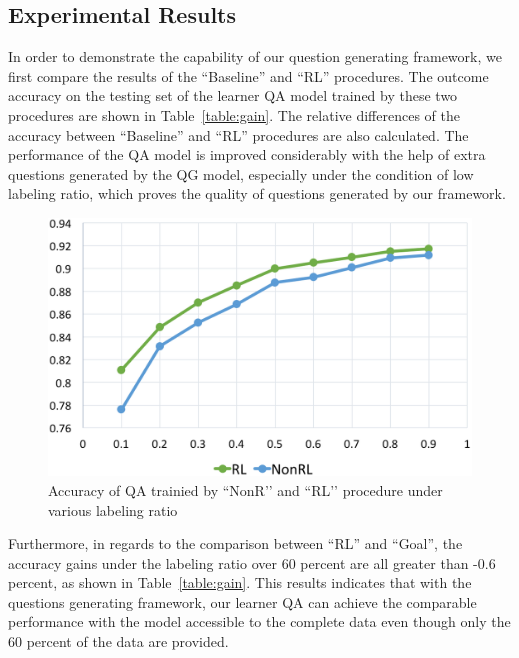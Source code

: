 \documentclass{article}
\begin{document}
\subsection{Experimental Results}
In order to demonstrate the capability of our question generating framework, we first compare the results of the ``Baseline'' and ``RL'' procedures.%
The outcome accuracy on the testing set of the learner QA model trained by these two procedures are shown in Table~\ref{table:gain}. The relative differences of the accuracy between ``Baseline'' and ``RL'' procedures are also calculated. The performance of the QA model is improved considerably with the help of extra questions generated by the QG model, especially under the condition of low labeling ratio, which proves the quality of questions generated by our framework.

\begin{figure}[t]
    \centering
    \includegraphics[width=0.95\linewidth]{fig/QA_acc.png}
    \caption{Accuracy of QA trainied by ``NonR’’ and ``RL’’ procedure under various labeling ratio}
    \label{fig:QA_acc}
\end{figure}

Furthermore, in regards to the comparison between ``RL'' and ``Goal'', the accuracy gains under the labeling ratio over 60 percent are all greater than -0.6 percent, as shown in Table~\ref{table:gain}. This results indicates that with the questions generating framework, our learner QA can achieve the comparable performance with the model accessible to the complete data even though only the 60 percent of the data are provided.
\end{document}
